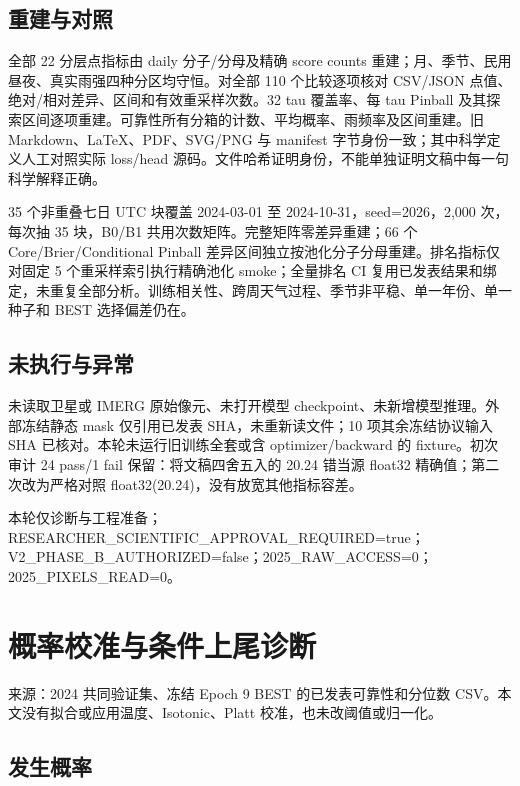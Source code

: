 \documentclass[UTF8,a4paper,10pt,fontset=fandol]{ctexart}
\begin{document}
\subsection*{重建与对照}

全部 22 分层点指标由 daily 分子/分母及精确 score counts 重建；月、季节、民用昼夜、真实雨强四种分区均守恒。对全部 110 个比较逐项核对 CSV/JSON 点值、绝对/相对差异、区间和有效重采样次数。32 tau 覆盖率、每 tau Pinball 及其探索区间逐项重建。可靠性所有分箱的计数、平均概率、雨频率及区间重建。旧 Markdown、LaTeX、PDF、SVG/PNG 与 manifest 字节身份一致；其中科学定义人工对照实际 loss/head 源码。文件哈希证明身份，不能单独证明文稿中每一句科学解释正确。\par

35 个非重叠七日 UTC 块覆盖 2024-03-01 至 2024-10-31，seed=2026，2,000 次，每次抽 35 块，B0/B1 共用次数矩阵。完整矩阵零差异重建；66 个 Core/Brier/Conditional Pinball 差异区间独立按池化分子分母重建。排名指标仅对固定 5 个重采样索引执行精确池化 smoke；全量排名 CI 复用已发表结果和绑定，未重复全部分析。训练相关性、跨周天气过程、季节非平稳、单一年份、单一种子和 BEST 选择偏差仍在。\par

\subsection*{未执行与异常}

未读取卫星或 IMERG 原始像元、未打开模型 checkpoint、未新增模型推理。外部冻结静态 mask 仅引用已发表 SHA，未重新读文件；10 项其余冻结协议输入 SHA 已核对。本轮未运行旧训练全套或含 optimizer/backward 的 fixture。初次审计 24 pass/1 fail 保留：将文稿四舍五入的 20.24 错当源 float32 精确值；第二次改为严格对照 float32(20.24)，没有放宽其他指标容差。\par

本轮仅诊断与工程准备；RESEARCHER\_SCIENTIFIC\_APPROVAL\_REQUIRED=true；V2\_PHASE\_B\_AUTHORIZED=false；2025\_RAW\_ACCESS=0；2025\_PIXELS\_READ=0。\par

\clearpage
\section*{概率校准与条件上尾诊断}

来源：2024 共同验证集、冻结 Epoch 9 BEST 的已发表可靠性和分位数 CSV。本文没有拟合或应用温度、Isotonic、Platt 校准，也未改阈值或归一化。\par

\subsection*{发生概率}
\end{document}
